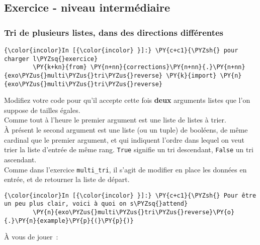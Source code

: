     \hypertarget{exercice---niveau-intermuxe9diaire}{%
\subsection{Exercice - niveau
intermédiaire}\label{exercice---niveau-intermuxe9diaire}}

    \hypertarget{tri-de-plusieurs-listes-dans-des-directions-diffuxe9rentes}{%
\subsubsection{Tri de plusieurs listes, dans des directions
différentes}\label{tri-de-plusieurs-listes-dans-des-directions-diffuxe9rentes}}

    \begin{Verbatim}[commandchars=\\\{\}]
{\color{incolor}In [{\color{incolor} }]:} \PY{c+c1}{\PYZsh{} pour charger l\PYZsq{}exercice}
        \PY{k+kn}{from} \PY{n+nn}{corrections}\PY{n+nn}{.}\PY{n+nn}{exo\PYZus{}multi\PYZus{}tri\PYZus{}reverse} \PY{k}{import} \PY{n}{exo\PYZus{}multi\PYZus{}tri\PYZus{}reverse}
\end{Verbatim}


    Modifiez votre code pour qu'il accepte cette fois \textbf{deux}
arguments listes que l'on suppose de tailles égales.\\

Comme tout à l'heure le premier argument est une liste de listes à
trier.\\

À présent le second argument est une liste (ou un tuple) de booléens, de
même cardinal que le premier argument, et qui indiquent l'ordre dans
lequel on veut trier la liste d'entrée de même rang. \texttt{True}
signifie un tri descendant, \texttt{False} un tri ascendant.\\

Comme dans l'exercice \texttt{multi\_tri}, il s'agit de modifier en
place les données en entrée, et de retourner la liste de départ.

    \begin{Verbatim}[commandchars=\\\{\}]
{\color{incolor}In [{\color{incolor} }]:} \PY{c+c1}{\PYZsh{} Pour être un peu plus clair, voici à quoi on s\PYZsq{}attend}
        \PY{n}{exo\PYZus{}multi\PYZus{}tri\PYZus{}reverse}\PY{o}{.}\PY{n}{example}\PY{p}{(}\PY{p}{)}
\end{Verbatim}


    À vous de jouer~:

